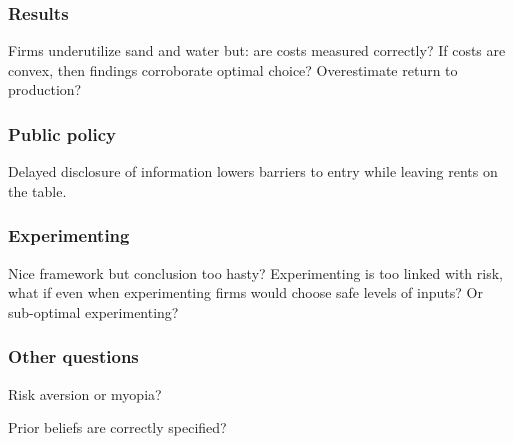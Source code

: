 \subsubsection{Results}

Firms underutilize sand and water but: are costs measured correctly? If costs are convex, then findings corroborate optimal choice? Overestimate return to production?

\subsubsection{Public policy}

Delayed disclosure of information lowers barriers to entry while leaving rents on the table.

\subsubsection{Experimenting}

Nice framework but conclusion too hasty? Experimenting is too linked with risk, what if even when experimenting firms would choose safe levels of inputs? Or sub-optimal experimenting?

\subsubsection{Other questions}

Risk aversion or myopia?

Prior beliefs are correctly specified?